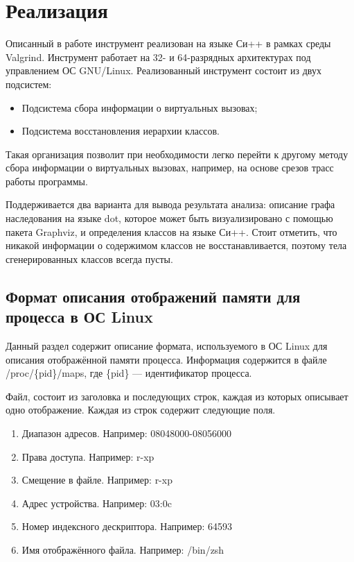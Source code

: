 \documentclass[a4paper,12pt,russian]{article}
\newcommand{\code}[1]{\textsf{#1}}
\begin{document}
\newpage
\section{Реализация}
Описанный в работе инструмент реализован на языке Си++ в рамках среды \code{Valgrind}. Инструмент работает на 32- и 64-разрядных архитектурах под управлением ОС \code{GNU/Linux}.
Реализованный инструмент состоит из двух подсистем:
\begin{itemize}
    \item Подсистема сбора информации о виртуальных вызовах;
    \item Подсистема восстановления иерархии классов.
\end{itemize}
Такая организация позволит при необходимости легко перейти к другому методу сбора информации о виртуальных вызовах, например, на основе срезов трасс работы программы.

Поддерживается два варианта для вывода результата анализа: описание графа наследования на языке \code{dot}, которое может быть визуализировано с помощью пакета \code{Graphviz}, и определения классов на языке Си++.
Стоит отметить, что никакой информации о содержимом классов не восстанавливается, поэтому тела сгенерированных классов всегда пусты.

\subsection{Формат описания отображений памяти для процесса в ОС \code{Linux}}
Данный раздел содержит описание формата, используемого в ОС \code{Linux} для описания отображённой памяти процесса.
Информация содержится в файле \code{/proc/\{pid\}/maps}, где \code{\{pid\}} --- идентификатор процесса.

Файл, состоит из заголовка и последующих строк, каждая из которых описывает одно отображение. Каждая из строк содержит следующие поля.

\begin{enumerate}
    \item Диапазон адресов. Например: \code{08048000-08056000}
    \item Права доступа. Например: \code{r-xp}
    \item Смещение в файле. Например: \code{r-xp}
    \item Адрес устройства. Например: \code{03:0c}
    \item Номер индексного дескриптора. Например: \code{64593}
    \item Имя отображённого файла. Например: \code{/bin/zsh}
\end{enumerate}
\end{document}
